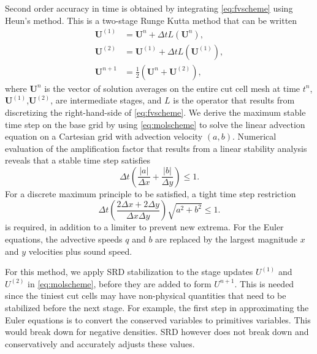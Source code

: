 Second order accuracy in time is obtained by integrating \eqref{eq:fvscheme} using Heun's method.  This is a two-stage Runge Kutta method that can be written
\begin{equation}\label{eq:molscheme}
\begin{aligned}
	\mathbf{U}^{(1)} &= \mathbf{U}^{n} + \Delta t L(\mathbf{U}^n), \\
	\mathbf{U}^{(2)} &= \mathbf{U}^{(1)} + \Delta t L(\mathbf{U}^{(1)}), \\
	\mathbf{U}^{n+1} &= \frac{1}{2}( \mathbf{U}^{n} + \mathbf{U}^{(2)} ) ,	
\end{aligned}
\end{equation}
where $\mathbf{U}^{n}$ is the vector of solution averages on the entire cut cell mesh at time $t^n$,
$\mathbf{U}^{(1)}$,$\mathbf{U}^{(2)}$, are intermediate stages, and $L$ is the operator that results
from discretizing the right-hand-side of \eqref{eq:fvscheme}.
We derive the maximum stable time step on the base grid by using \eqref{eq:molscheme} to solve the linear advection equation on a Cartesian grid with advection velocity $(a,b)$.
Numerical evaluation of the amplification factor that results from a linear stability analysis reveals that a stable time step satisfies
\begin{equation}\label{eq:vn1}
\Delta t   \left( \frac{|a|}{\Delta x} + \frac{|b|}{\Delta y} \right)\leq 1.
\end{equation}
For a discrete maximum principle to be satisfied, a tight time step restriction 
\begin{equation}
\Delta t  \left( \frac{2\Delta x + 2 \Delta y}{\Delta x \Delta y} \right) \sqrt{a^2 + b^2}\leq 1 .
\end{equation}
is required, in addition to a limiter to prevent new extrema.
For the Euler equations, the advective speeds $q$ and $b$ are replaced
by the largest magnitude $x$ and $y$ velocities  plus sound speed.

For this method, we apply SRD stabilization to the stage updates
$U^{(1)}$ and $U^{(2)}$ in \eqref{eq:molscheme}, before they are added to 
form $U^{n+1}$.  This is needed since the tiniest cut cells may have
non-physical quantities that need to be stabilized before  the
next stage.  For example, the first step in approximating the Euler
equations is to convert the conserved variables to primitives variables.
This would break down for negative densities. SRD however does not break
down and conservatively and accurately adjusts these values.

